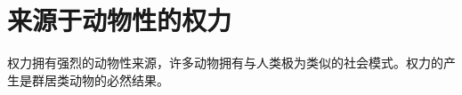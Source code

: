 \documentclass[main.tex]{subfiles}
\begin{document}
\section{来源于动物性的权力}
权力拥有强烈的动物性来源，许多动物拥有与人类极为类似的社会模式。权力的产生是群居类动物的必然结果。
\end{document}
